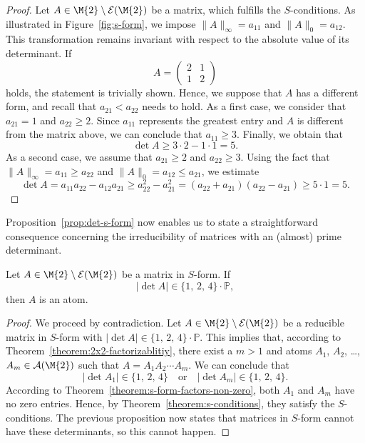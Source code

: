 \begin{proof}
Let $A \in \M{2}\setminus\mathcal{E}(\M{2})$ be a matrix, which fulfills the $S$-conditions. As illustrated in Figure~\ref{fig:s-form}, we impose $\|A\|_{\infty} = a_{11}$ and $\| A \|_0 = a_{12}$. This transformation remains invariant with respect to the absolute value of its determinant. If 
\[ A = \begin{pmatrix} 2 & 1 \\ 1 & 2 \end{pmatrix} \]
holds, the statement is trivially shown. Hence, we suppose that $A$ has a different form, and recall that $a_{21} < a_{22}$ needs to hold. As a first case, we consider that $a_{21} = 1$ and $a_{22} \geq 2$. Since $a_{11}$ represents the greatest entry and $A$ is different from the matrix above, we can conclude that $a_{11} \geq 3$. Finally, we obtain that
\[ \det{A} \geq 3\cdot 2 - 1 \cdot 1 = 5. \]
As a second case, we assume that $a_{21} \geq 2$ and $a_{22} \geq 3$. Using the fact that $\|A\|_{\infty} = a_{11} \geq a_{22}$ and $\|A\|_{0} = a_{12} \leq a_{21}$, we estimate
\[
\det{A} = a_{11}a_{22} - a_{12}a_{21} \geq a_{22}^2 - a_{21}^2 = (a_{22} + a_{21})(a_{22} - a_{21}) \geq 5 \cdot 1=5.
\]
\end{proof}

Proposition~\ref{prop:det-s-form} now enables us to state a straightforward consequence concerning the irreducibility of matrices with an (almost) prime determinant.

\begin{corollary}\label{cor:prime-det}
Let $A \in \M{2}\setminus\mathcal{E}(\M{2})$ be a matrix in $S$-form. If 
\[ \left \lvert \det{A} \right \rvert \in \{ 1,\,2,\,4 \} \cdot \mathbb{P},\]
then $A$ is an atom.
\end{corollary}

\begin{proof}
We proceed by contradiction. Let $A \in \M{2}\setminus\mathcal{E}(\M{2})$ be a reducible matrix in $S$-form with $ \left \lvert \det{A} \right \rvert  \in \{ 1,\,2,\,4 \} \cdot \mathbb{P}$. This implies that, according to Theorem~\ref{theorem:2x2-factorizablitiy}, there exist a $m > 1$ and atoms $A_1$, $A_2$, \dots, $A_m \in \mathcal{A}(\M{2})$ such that $A = A_1A_2\cdots A_m$. We can conclude that 
\[  \left \lvert \det{A_1} \right \rvert  \in \{ 1,\,2,\,4 \} \quad \text{or} \quad  \left \lvert \det{A_m} \right \rvert  \in \{ 1,\,2,\,4 \}. \]
According to Theorem~\ref{theorem:s-form-factors-non-zero}, both $A_1$ and $A_m$ have no zero entries. Hence, by Theorem~\ref{theorem:s-conditions}, they satisfy the $S$-conditions. The previous proposition now states that matrices in $S$-form cannot have these determinants, so this cannot happen.
\end{proof}

